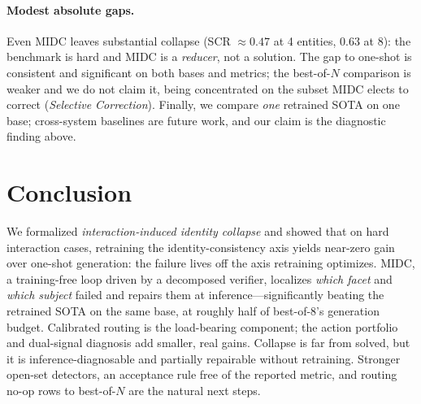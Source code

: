 \documentclass[letterpaper]{article}
\begin{document}
\paragraph{Modest absolute gaps.} Even MIDC leaves substantial collapse (SCR ${\approx}0.47$ at 4 entities, $0.63$ at 8): the benchmark is hard and MIDC is a \emph{reducer}, not a solution. The gap to one-shot is consistent and significant on both bases and metrics; the best-of-$N$ comparison is weaker and we do not claim it, being concentrated on the subset MIDC elects to correct (\emph{Selective Correction}). Finally, we compare \emph{one} retrained SOTA on one base; cross-system baselines are future work, and our claim is the diagnostic finding above.

\section{Conclusion}

We formalized \emph{interaction-induced identity collapse} and showed that on hard interaction cases, retraining the identity-consistency axis yields near-zero gain over one-shot generation: the failure lives off the axis retraining optimizes. MIDC, a training-free loop driven by a decomposed verifier, localizes \emph{which facet} and \emph{which subject} failed and repairs them at inference---significantly beating the retrained SOTA on the same base, at roughly half of best-of-8's generation budget. Calibrated routing is the load-bearing component; the action portfolio and dual-signal diagnosis add smaller, real gains. Collapse is far from solved, but it is inference-diagnosable and partially repairable without retraining. Stronger open-set detectors, an acceptance rule free of the reported metric, and routing no-op rows to best-of-$N$ are the natural next steps.



\end{document}
